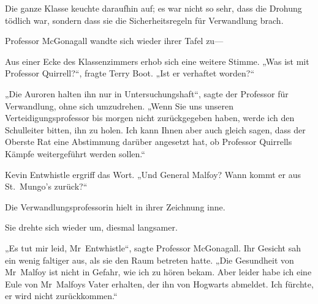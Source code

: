 Die ganze Klasse keuchte daraufhin auf; es war nicht so sehr, dass die Drohung tödlich war, sondern dass sie die Sicherheitsregeln für Verwandlung brach.

Professor McGonagall wandte sich wieder ihrer Tafel zu—

Aus einer Ecke des Klassenzimmers erhob sich eine weitere Stimme.
„Was ist mit Professor Quirrell?“, fragte Terry Boot.
„Ist er verhaftet worden?“

„Die Auroren halten ihn nur in Untersuchungshaft“, sagte der Professor für Verwandlung, ohne sich umzudrehen.
„Wenn Sie uns unseren Verteidigungsprofessor bis morgen nicht zurückgegeben haben, werde ich den Schulleiter bitten, ihn zu holen. Ich kann Ihnen aber auch gleich sagen, dass der Oberste Rat eine Abstimmung darüber angesetzt hat, ob Professor Quirrells Kämpfe weitergeführt werden sollen.“

Kevin Entwhistle ergriff das Wort.
„Und General Malfoy? Wann kommt er aus St.~Mungo’s zurück?“

Die Verwandlungsprofessorin hielt in ihrer Zeichnung inne.

Sie drehte sich wieder um, diesmal langsamer.

„Es tut mir leid, Mr~Entwhistle“, sagte Professor McGonagall. Ihr Gesicht sah ein wenig faltiger aus, als sie den Raum betreten hatte.
„Die Gesundheit von Mr~Malfoy ist nicht in Gefahr, wie ich zu hören bekam. Aber leider habe ich eine Eule von Mr~Malfoys Vater erhalten, der ihn von Hogwarts abmeldet. Ich fürchte, er wird nicht zurückkommen.“
